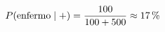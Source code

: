 \documentclass[preview]{standalone}
\begin{document}
\begin{align*}
\special{dvisvgm:raw <g id='unique000'>}P(\text{enfermo}\mid +)=\frac{100}{100+500}\approx17\,\%\special{dvisvgm:raw </g>}
\end{align*}
\end{document}
